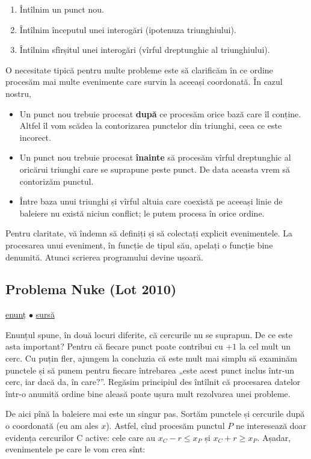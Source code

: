 \documentclass[../main.tex]{subfiles}
\begin{document}
\begin{enumerate}
  \item Întîlnim un punct nou.
  \item Întîlnim începutul unei interogări (ipotenuza triunghiului).
  \item Întîlnim sfîrșitul unei interogări (vîrful dreptunghic al triunghiului).
\end{enumerate}

O necesitate tipică pentru multe probleme este să clarificăm în ce ordine procesăm mai multe evenimente care survin la aceeași coordonată. În cazul nostru,

\begin{itemize}
  \item Un punct nou trebuie procesat \textbf{după} ce procesăm orice bază care îl conține. Altfel îl vom scădea la contorizarea punctelor din triunghi, ceea ce este incorect.
  \item Un punct nou trebuie procesat \textbf{înainte} să procesăm vîrful dreptunghic al oricărui triunghi care se suprapune peste punct. De data aceasta vrem să contorizăm punctul.
  \item Între baza unui triunghi și vîrful altuia care coexistă pe aceeași linie de baleiere nu există niciun conflict; le putem procesa în orice ordine.
\end{itemize}

Pentru claritate, vă îndemn să definiți și să colectați explicit evenimentele. La procesarea unui eveniment, în funcție de tipul său, apelați o funcție bine denumită. Atunci scrierea programului devine ușoară.

\subsection{Problema Nuke (Lot 2010)}
\label{problem:nuke}

\href{https://kilonova.ro/problems/2260/}{enunț}
$\bullet$
\hyperref[code:nuke]{sursă}

Enunțul spune, în două locuri diferite, că cercurile nu se suprapun. De ce este asta important? Pentru că fiecare punct poate contribui cu $+1$ la cel mult un cerc. Cu puțin fler, ajungem la concluzia că este mult mai simplu să examinăm punctele și să punem pentru fiecare întrebarea „este acest punct inclus într-un cerc, iar dacă da, în care?”. Regăsim principiul des întîlnit că procesarea datelor într-o anumită ordine bine aleasă poate ușura mult rezolvarea unei probleme.

De aici pînă la baleiere mai este un singur pas. Sortăm punctele și cercurile după o coordonată (eu am ales $x$). Astfel, cînd procesăm punctul $P$ ne interesează doar evidența cercurilor C active: cele care au  $x_C - r \leq x_P$ și $x_C + r \geq x_P$. Așadar, evenimentele pe care le vom crea sînt:
\end{document}
